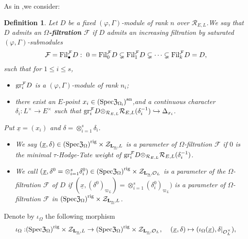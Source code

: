 \documentclass[SecEq,CM,GP]{degruyter-crelle} %
\theoremstyle{plain}
\newtheorem{dfn}[thm]{Definition}
\newcommand{\fil}{{\rm Fil}}
\newcommand{\gr}{{\rm gr}}
\newcommand{\rigerch}{{\mathcal{Z}_{\bL_{\ul{n}},\mathcal{O}_L}}}
\newcommand{\rigerchl}{{\mathcal{Z}_{\bL_{\ul{n}},L}}}
\newcommand{\Spec}{\rm Spec}
\newcommand{\sban}{{\left(\Spec\mathfrak{Z}_{\Omega}\right)^{\mathrm{rig}}}}
\newcommand{\tee}{{{\otimes}_{\cR_{E,L}}}}
\newcommand{\ul}{\underline}
\newcommand{\bL}{{\mathbf{L}}}
\newcommand{\cR}{\mathcal R}
\newcommand{\cF}{\mathcal F}
\begin{document}
As in \cite[Section 4.1.2,\;Definition 4.1.6]{Ding2021},\;we consider:
\begin{dfn}\label{dfnomegafil} Let $D$ be a fixed $(\varphi,\Gamma)$-module of rank $n$ over $\cR_{E,L}$.\;We say that $D$ admits an \textbf{$\Omega$-filtration} $\cF$ if $D$ admits an increasing filtration by saturated $(\varphi,\Gamma)$-submodules
\[\cF=\fil_{\bullet}^{\cF} D: \ 0 =\fil_0^{\cF} D \subsetneq \fil_1^{\cF} D \subsetneq \cdots \subsetneq \fil_{k}^{\cF} D=D,\]
such that for $1\leq i\leq s$,\;
\begin{itemize}
	\item $\gr^{\cF}_{i}D$ is a $(\varphi,\Gamma)$-module of rank $n_i$;\;
	\item there exist an $E$-point $x_i\in \left(\Spec\mathfrak{Z}_{\Omega_i}\right)^{\mathrm{an}}$,\;and a continuous character $\delta_i:L^\times\rightarrow  E^\times$ such that
	$\gr^{\cF}_{i}D\tee \cR_{E,L}(\delta_{i}^{-1})\hookrightarrow \Delta_{x_i}$.\;
\end{itemize}
Put $\underline{x}=(x_i)$ and $\delta=\otimes_{i=1}^s\delta_i$.\;
\begin{itemize}
	\item We say $(\underline{x},\delta)\in \sban\times\rigerchl $ is a parameter of $\Omega$-filtration $\cF$ if $0$ is the minimal $\tau$-Hodge-Tate weight of $\gr^{\cF}_{i}D\tee \cR_{E,L}(\delta_{i}^{-1})$.\;
	\item We call $(\underline{x},\delta^0=\otimes_{i=1}^s\delta^0_i)\in \sban\times\rigerch $ is a parameter of the $\Omega$-filtration $\cF$ of $D$ if $(\underline{x},(\delta^0)_{\varpi_L})=\otimes_{i=1}^s(\delta^0_i)_{\varpi_L})$ is a parameter of $\Omega$-filtration $\cF$ in $\sban\times\rigerchl $.\;
\end{itemize}

\end{dfn}
Denote by $\iota_{\Omega}$ the following morphism
\begin{equation}\label{notationbasisrigidmorphism}
\begin{aligned}
	\iota_{\Omega}:&\sban\times\rigerchl\rightarrow \sban\times\rigerch,\;
	&(\underline{x},\delta)\mapsto (\iota_{\Omega}(\underline{x}),\delta|_{\mathcal{O}_L^\times}),
\end{aligned}
\end{equation}
\end{document}
